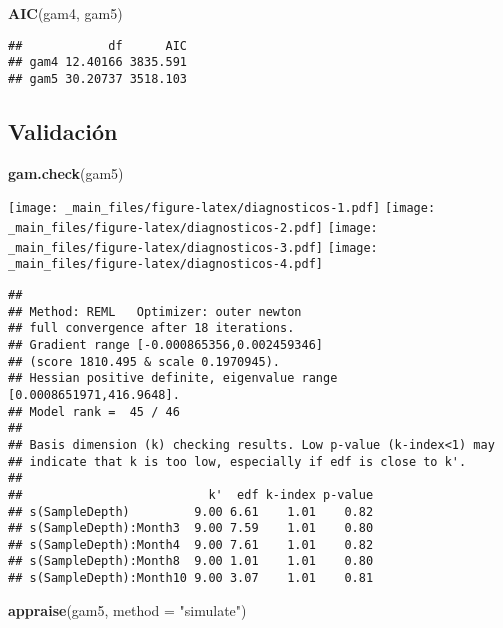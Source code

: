 \documentclass[
]{book}
\newenvironment{Shaded}{\begin{snugshade}}{\end{snugshade}}
\newcommand{\DataTypeTok}[1]{\textcolor[rgb]{0.13,0.29,0.53}{#1}}
\newcommand{\KeywordTok}[1]{\textcolor[rgb]{0.13,0.29,0.53}{\textbf{#1}}}
\newcommand{\NormalTok}[1]{#1}
\newcommand{\StringTok}[1]{\textcolor[rgb]{0.31,0.60,0.02}{#1}}
\begin{document}
\begin{Shaded}
\begin{Highlighting}[]
\KeywordTok{AIC}\NormalTok{(gam4, gam5)}
\end{Highlighting}
\end{Shaded}

\begin{verbatim}
##            df      AIC
## gam4 12.40166 3835.591
## gam5 30.20737 3518.103
\end{verbatim}

\hypertarget{validaciuxf3n-2}{%
\subsection{Validación}\label{validaciuxf3n-2}}

\begin{Shaded}
\begin{Highlighting}[]
\KeywordTok{gam.check}\NormalTok{(gam5)}
\end{Highlighting}
\end{Shaded}

\texttt{[image: \_main\_files/figure-latex/diagnosticos-1.pdf]} \texttt{[image: \_main\_files/figure-latex/diagnosticos-2.pdf]} \texttt{[image: \_main\_files/figure-latex/diagnosticos-3.pdf]} \texttt{[image: \_main\_files/figure-latex/diagnosticos-4.pdf]}

\begin{verbatim}
## 
## Method: REML   Optimizer: outer newton
## full convergence after 18 iterations.
## Gradient range [-0.000865356,0.002459346]
## (score 1810.495 & scale 0.1970945).
## Hessian positive definite, eigenvalue range [0.0008651971,416.9648].
## Model rank =  45 / 46 
## 
## Basis dimension (k) checking results. Low p-value (k-index<1) may
## indicate that k is too low, especially if edf is close to k'.
## 
##                          k'  edf k-index p-value
## s(SampleDepth)         9.00 6.61    1.01    0.82
## s(SampleDepth):Month3  9.00 7.59    1.01    0.80
## s(SampleDepth):Month4  9.00 7.61    1.01    0.82
## s(SampleDepth):Month8  9.00 1.01    1.01    0.80
## s(SampleDepth):Month10 9.00 3.07    1.01    0.81
\end{verbatim}

\begin{Shaded}
\begin{Highlighting}[]
\KeywordTok{appraise}\NormalTok{(gam5, }\DataTypeTok{method =} \StringTok{"simulate"}\NormalTok{)}
\end{Highlighting}
\end{Shaded}
\end{document}
